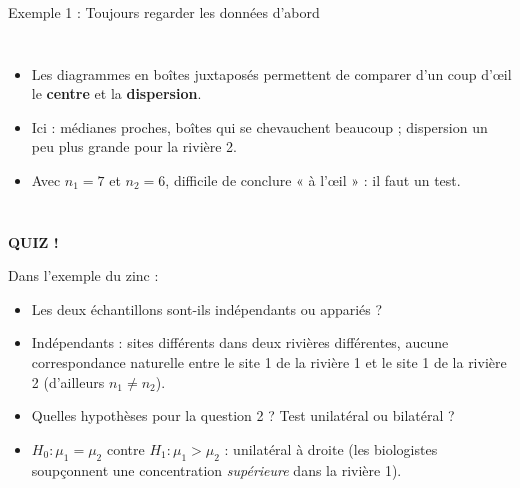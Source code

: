 \documentclass{BeamerTemplate}
\begin{document}
\begin{frame}[t]{Exemple 1 : Toujours regarder les données d'abord}
  \begin{columns}[T]
      \centering

      \small
      \begin{itemize}\itemsep 3mm
        \item Les \alert{diagrammes en boîtes juxtaposés} permettent de comparer d'un coup d'\oe il le \textbf{centre} et la \textbf{dispersion}.
        \item Ici : médianes proches, boîtes qui se chevauchent beaucoup ; dispersion un peu plus grande pour la rivière 2.
        \item Avec $n_1 = 7$ et $n_2 = 6$, difficile de conclure « à l'\oe il » : il faut un \alert{test}.
      \end{itemize}
  \end{columns}
\end{frame}

\begin{frame}[plain,t]
  \centerline{\LARGE\bfseries\alert{QUIZ !}}

  \medskip
  Dans l'exemple du zinc :
  \begin{itemize}\itemsep 0.7cm
    \item Les deux échantillons sont-ils indépendants ou appariés ?
    \item<2-> \alert{Indépendants} : sites différents dans deux rivières différentes, aucune correspondance naturelle entre le site 1 de la rivière 1 et le site 1 de la rivière 2 (d'ailleurs $n_1 \neq n_2$).
    \item Quelles hypothèses pour la question 2 ? Test unilatéral ou bilatéral ?
    \item<2-> $H_0: \mu_1 = \mu_2$ contre $H_1: \mu_1 > \mu_2$ : \alert{unilatéral à droite} (les biologistes soupçonnent une concentration \emph{supérieure} dans la rivière 1).
  \end{itemize}
\end{frame}
\end{document}
